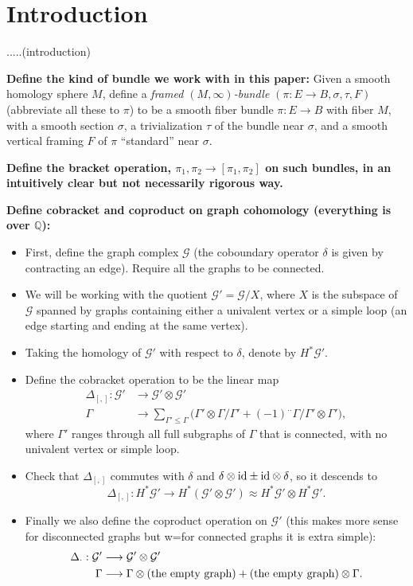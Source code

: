 \documentclass[11pt]{article}
\theoremstyle{definition}
\theoremstyle{remark}
\def\Q{\mathbb{Q}}
\def\cG{\mathcal{G}}
\def\tn#1{\textnormal{#1}}
\begin{document}
\setlength{\parskip}{\baselineskip}
\setlength{\parindent}{0cm}

\section{Introduction}

.....(introduction)

{\bf Define the kind of bundle we work with in this paper:}
Given a smooth homology sphere $M$, define a {\it framed $(M,\infty)$-bundle} $(\pi:E\to B,\sigma, \tau, F)$ (abbreviate all these to $\pi$) to be a smooth fiber bundle $\pi:E\to B$ with fiber $M$, with a smooth section $\sigma$, a trivialization $\tau$ of the bundle near $\sigma$, and a smooth vertical framing $F$ of $\pi$ ``standard'' near $\sigma$. 

{\bf Define the bracket operation, $\pi_1,\pi_2\to[\pi_1,\pi_2]$ on such bundles, in an intuitively clear but not necessarily rigorous way.}

{\bf Define cobracket and coproduct on graph cohomology (everything is over $\Q$):}
\begin{itemize}
\item First, define the graph complex $\cG$ (the coboundary operator $\delta$ is given by contracting an edge). Require all the graphs to be connected. 
\item We will be working with the quotient $\cG'=\cG/X$, where $X$ is the subspace of $\cG$ spanned by graphs containing either a univalent vertex or a simple loop (an edge starting and ending at the same vertex). 
\item Taking the homology of $\cG'$ with respect to $\delta$, denote by $H^*{\cG'}$. 

\item Define the cobracket operation to be the linear map
\begin{align*}
\Delta_{[,]}: \cG'&\longrightarrow\cG'\otimes\cG'\\
\Gamma&\longrightarrow \sum_{\Gamma'\le\Gamma}\big(\Gamma'\otimes\Gamma/\Gamma'+(-1)^{..}\Gamma/\Gamma'\otimes\Gamma'\big), 
\end{align*}
where $\Gamma'$ ranges through all full subgraphs of $\Gamma$ that is connected, with no univalent vertex or simple loop.
\item Check that $\Delta_{[,]}$ commutes with $\delta$ and $\delta\otimes\tn{id}\pm\tn{id}\otimes\delta$, so it descends to 
$$\Delta_{[,]}: H^*{\cG'}\longrightarrow H^*(\cG'\otimes\cG')\approx H^*{\cG'}\otimes H^*{\cG'}.$$

\item Finally we also define the coproduct operation on $\cG'$ (this makes more sense for disconnected graphs but w=for connected graphs it is extra simple):  
\begin{align*}
\Delta_{\cdot}: \cG'&\longrightarrow \cG'\otimes\cG'\\
\Gamma&\longrightarrow \Gamma\otimes \tn{(the empty graph)} + \tn{(the empty graph)}\otimes\Gamma.
\end{align*}

\end{itemize}
\end{document}
